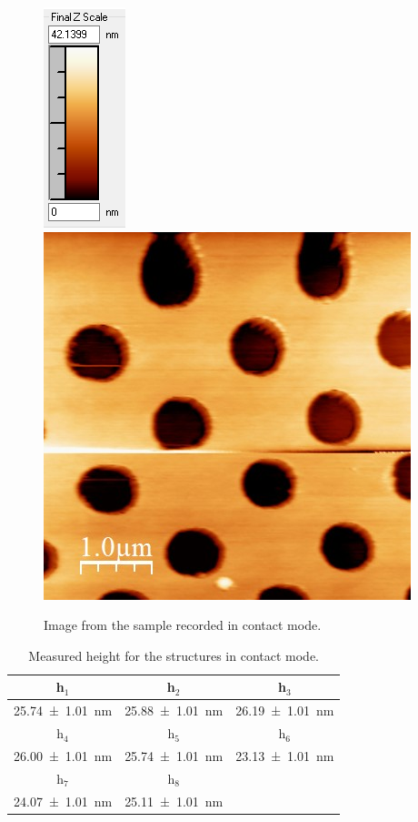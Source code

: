 \documentclass[%
 reprint,
amsmath,amssymb,
pra,
]{revtex4-1}
\begin{document}
\begin{figure}
\centering
\includegraphics[scale=0.7]{Bilder/Contact_Mode/Rohdaten/try1_scalebar.PNG}
\includegraphics[scale=0.5]{Bilder/Contact_Mode/Rohdaten/try1.JPG}
\caption{Image from the sample recorded in contact mode.}
\label{fig:Contact_raw_data}
\end{figure}

\begin{table}[h]
\centering
\begin{tabular}{|c|c|c|}
\hline 
h$_1$ & h$_2$ & h$_3$ \\ 
\hline 
\SI{25.74 \pm 1.01}{nm} & \SI{25.88 \pm 1.01}{nm} & \SI{26.19 \pm 1.01}{nm} \\ 
\hline
h$_4$ & h$_5$ & h$_6$ \\ 
\hline 
\SI{26.00 \pm 1.01}{nm} & \SI{25.74 \pm 1.01}{nm} & \SI{23.13 \pm 1.01}{nm}  \\ 
\hline 
 h$_7$ & h$_8$ &  \\ 
\hline 
\SI{24.07\pm 1.01}{nm} & \SI{25.11 \pm 1.01}{nm} &  \\ 
\hline 
\end{tabular} 
\caption{Measured height for the structures in contact mode.}
\label{tab:Contact_height}
\end{table}
\end{document}
